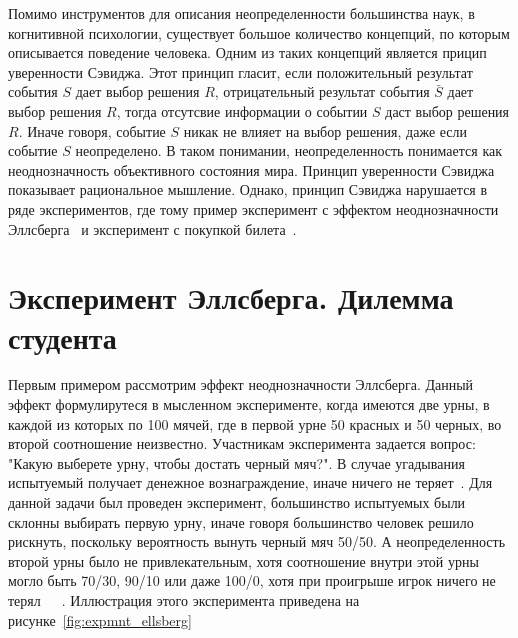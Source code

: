 Помимо инструментов для описания неопределенности большинства наук, в когнитивной психологии, существует большое
количество концепций, по которым описывается поведение человека. Одним из таких концепций
является прицип уверенности Сэвиджа. Этот принцип гласит, если положительный результат события $S$
дает выбор решения $R$, отрицательный результат события $\bar{S}$ дает выбор решения $R$, тогда
отсутсвие информации о событии $S$ даст выбор решения $R$. Иначе говоря, событие $S$ никак
не влияет на выбор решения, даже если событие $S$ неопределено. В таком понимании, неопределенность
понимается как неоднозначность объективного состояния мира. Принцип уверенности Сэвиджа показывает
рациональное мышление. Однако, принцип Сэвиджа нарушается в ряде экспериментов, где тому пример
эксперимент с эффектом неоднозначности Эллсберга~\citep{daniel1961risk} и эксперимент с покупкой
билета~\citep{tversky1992disjunction}.

\section{Эксперимент Эллсберга. Дилемма студента}

Первым примером рассмотрим эффект неоднозначности Эллсберга. Данный эффект формулирутеся
в мысленном эксперименте, когда имеются две урны, в каждой из которых по 100 мячей, где в первой
урне 50 красных и 50 черных, во второй соотношение неизвестно. Участникам эксперимента задается
вопрос: "Какую выберете урну, чтобы достать черный мяч?". В случае угадывания испытуемый получает денежное
вознаграждение, иначе ничего не теряет~\citep{daniel1961risk}. Для данной задачи был проведен эксперимент,
большинство испытуемых были склонны выбирать первую урну, иначе говоря большинство человек решило рискнуть,
поскольку вероятность вынуть черный мяч 50/50. А неопределенность второй урны было не привлекательным,
хотя соотношение внутри этой урны могло быть 70/30, 90/10 или даже 100/0, хотя при проигрыше игрок ничего
не терял~\citep{daniel1961risk}~\citep{dominiak2012dynamic}~\citep{camerer1992recent}. Иллюстрация
этого эксперимента приведена на рисунке~\ref{fig:expmnt_ellsberg}

